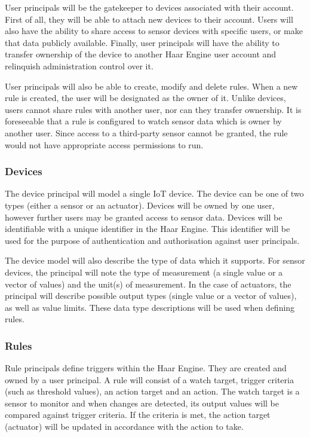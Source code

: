         User principals will be the gatekeeper to devices associated with their account. First of all, they will be able to attach new devices to their account. Users will also have the ability to share access to sensor devices with specific users, or make that data publicly available. Finally, user principals will have the ability to transfer ownership of the device to another Haar Engine user account and relinquish administration control over it.

        User principals will also be able to create, modify and delete rules. When a new rule is created, the user will be designated as the owner of it. Unlike devices, users cannot share rules with another user, nor can they transfer ownership. It is foreseeable that a rule is configured to watch sensor data which is owner by another user. Since access to a third-party sensor cannot be granted, the rule would not have appropriate access permissions to run.

      \subsubsection{Devices}
        The device principal will model a single IoT device. The device can be one of two types (either a sensor or an actuator). Devices will be owned by one user, however further users may be granted access to sensor data. Devices will be identifiable with a unique identifier in the Haar Engine. This identifier will be used for the purpose of authentication and authorisation against user principals.

        The device model will also describe the type of data which it supports. For sensor devices, the principal will note the type of measurement (a single value or a vector of values) and the unit(s) of measurement. In the case of actuators, the principal will describe possible output types (single value or a vector of values), as well as value limits. These data type descriptions will be used when defining rules.

      \subsubsection{Rules}
        Rule principals define triggers within the Haar Engine. They are created and owned by a user principal. A rule will consist of a watch target, trigger criteria (such as threshold values), an action target and an action. The watch target is a sensor to monitor and when changes are detected, its output values will be compared against trigger criteria. If the criteria is met, the action target (actuator) will be updated in accordance with the action to take.

